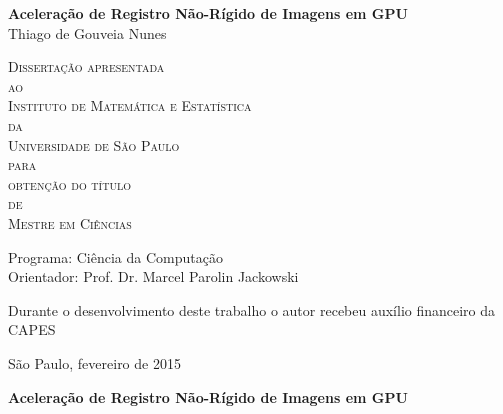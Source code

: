 \documentclass[11pt,twoside,a4paper]{book}
\begin{document}
\frontmatter
\fancyhead[RO]{{\footnotesize\rightmark}\hspace{2em}\thepage}
\setcounter{tocdepth}{2}
\fancyhead[LE]{\thepage\hspace{2em}\footnotesize{\leftmark}}
\fancyhead[RE,LO]{}
\fancyhead[RO]{{\footnotesize\rightmark}\hspace{2em}\thepage}

\onehalfspacing  %

\thispagestyle{empty}
\begin{center}
    \vspace*{2.3cm}
    \textbf{\Large{Aceleração de Registro Não-Rígido de Imagens em GPU}}\\

    \vspace*{1.2cm}
    \Large{Thiago de Gouveia Nunes}

    \vskip 2cm
    \textsc{
    Dissertação apresentada\\[-0.25cm]
    ao\\[-0.25cm]
    Instituto de Matemática e Estatística\\[-0.25cm]
    da\\[-0.25cm]
    Universidade de São Paulo\\[-0.25cm]
    para\\[-0.25cm]
    obtenção do título\\[-0.25cm]
    de\\[-0.25cm]
    Mestre em Ciências}

    \vskip 1.5cm
    Programa: Ciência da Computação\\
    Orientador: Prof. Dr. Marcel Parolin Jackowski

    \vskip 1cm
    \normalsize{Durante o desenvolvimento deste trabalho o autor recebeu auxílio
    financeiro da CAPES}

    \vskip 0.5cm
    \normalsize{São Paulo, fevereiro de 2015}
\end{center}

%
%
%
\newpage
\thispagestyle{empty}
    \begin{center}
        \vspace*{2.3 cm}
        \textbf{\Large{Aceleração de Registro Não-Rígido de Imagens em GPU}}\\
        \vspace*{2 cm}
    \end{center}
\end{document}
